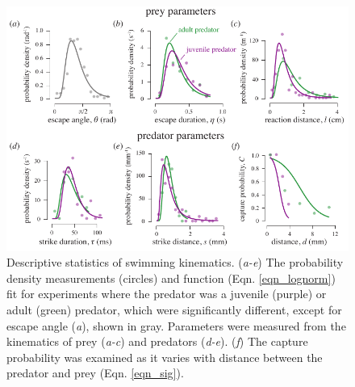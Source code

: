 \documentclass[]{rsos}%
\begin{document}
\begin{figure}[!h]
\centering
	\includegraphics[width=5.5in]{fig_PDFs}
\caption{Descriptive statistics of swimming kinematics. 
(\textit{a-e}) The probability density measurements (circles) and function (Eqn. \ref{eqn_lognorm}) fit for experiments where the predator was a juvenile (purple) or adult (green) predator, which were significantly different, except for escape angle (\textit{a}), shown in gray. 
Parameters were measured from the kinematics of prey (\textit{a-c}) and predators (\textit{d-e}).
(\textit{f}) The capture probability was examined as it varies with distance between the predator and prey (Eqn. \ref{eqn_sig}).  
}
\label{fig_PDF}
\end{figure}

\pagebreak

\pagebreak
\end{document}
